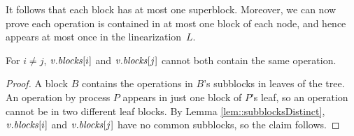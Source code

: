 It follows that each block has at most one superblock.
Moreover, we can now prove each operation is contained in at most one block of each node,
and hence appears at most once in the linearization~$L$.

\begin{corollary}\label{cor::noDuplicates}
For  $i\neq j$, $\mbox{\textnormal{\textit{v}}}.\mbox{\textit{blocks}}[i]$ and $\mbox{\textnormal{\textit{v}}}.\mbox{\textit{blocks}}[j]$ cannot both contain the same operation.
\end{corollary}
\begin{proof}
A block $B$ contains the operations in $B$'s subblocks in leaves of the tree.
An operation by process $P$ appears in just one block of $P$'s leaf, so
an operation 
cannot be in two different leaf blocks. 
By Lemma \ref{lem::subblocksDistinct}, $\mbox{\textnormal{\textit{v}}}.\mbox{\textit{blocks}}[i]$ and $\mbox{\textnormal{\textit{v}}}.\mbox{\textit{blocks}}[j]$ have no common subblocks, so the claim follows.
\end{proof}



%


